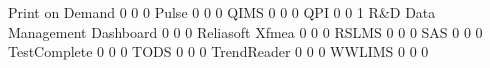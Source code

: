 \documentclass{article}
\begin{document}
\begin{Schunk}
\begin{Soutput}
  Print on Demand                              0            0             0
  Pulse                                        0            0             0
  QIMS                                         0            0             0
  QPI                                          0            0             1
  R&D Data Management Dashboard                0            0             0
  Reliasoft Xfmea                              0            0             0
  RSLMS                                        0            0             0
  SAS                                          0            0             0
  TestComplete                                 0            0             0
  TODS                                         0            0             0
  TrendReader                                  0            0             0
  WWLIMS                                       0            0             0
                                          

\end{Soutput}
\end{Schunk}
\end{document}
